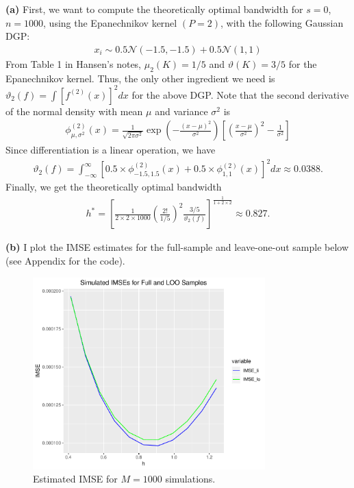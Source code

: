 \documentclass[12pt]{article}
\newcommand{\N}{\mathcal{N}}
\begin{document}
\textbf{(a)} First, we want to compute the theoretically optimal bandwidth for $s=0$, $n=1000$, using the Epanechnikov kernel $(P=2)$, with the following Gaussian DGP:
\begin{align*}
x_i \sim 0.5 \N(-1.5,-1.5) + 0.5\N(1,1)
\end{align*}
From Table 1 in Hansen's notes, $\mu_2(K)=1/5$ and $\vartheta(K)=3/5$ for the Epanechnikov kernel. Thus, the only other ingredient we need is $\vartheta_{2}(f) = \int [f^{(2)}(x)]^2 dx$ for the above DGP. Note that the second derivative of the normal density with mean $\mu$ and variance $\sigma^2$ is
\begin{align*}
\phi^{(2)}_{\mu, \sigma^2}(x) = \frac{1}{\sqrt{2\pi \sigma^2}}\exp\left(-\frac{(x-\mu)^2}{\sigma^2}\right)\left[\left(\frac{x-\mu}{\sigma^2}\right)^2 - \frac{1}{\sigma^2}\right]
\end{align*}
Since differentiation is a linear operation, we have
\begin{align*}
\vartheta_{2}(f) = \int_{-\infty}^\infty [0.5\times\phi^{(2)}_{-1.5, 1.5}(x) + 0.5\times \phi^{(2)}_{1, 1}(x)]^2 dx \approx 0.0388.
\end{align*}
Finally, we get the theoretically optimal bandwidth
\begin{align*}
h^* = \left[\frac{1}{2 \times 2 \times 1000}\left(\frac{2!}{1/5}\right)^2\frac{3/5}{\vartheta_{2}(f)}\right]^{\frac{1}{1+2\times 2}} \approx 0.827.
\end{align*}

\textbf{(b)} I plot the IMSE estimates for the full-sample and leave-one-out sample below (see Appendix for the code).

\begin{figure}[h]
    \centering
    
        \includegraphics[width=0.8\textwidth]{Q1_IMSE.pdf}
        \caption{Estimated IMSE for $M=1000$ simulations.}

\end{figure}
\end{document}
